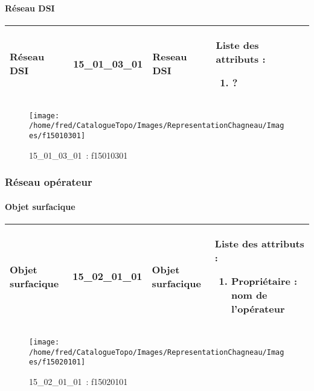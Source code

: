 \documentclass[12pt,titlepage]{book}
\begin{document}
\paragraph{Réseau DSI}
\noindent
\vspace{\baselineskip}

\renewcommand{\arraystretch}{1.2}
\begin{supertabular}{|p{10cm}|c|p{13cm}|p{12cm}|}
 Réseau DSI & 15\_01\_03\_01 & Reseau DSI & Liste des attributs :
\begin{enumerate}
  \item ?\end{enumerate}
\\
\hline
\end{supertabular}
\begin{figure}[h!]
  \hfill         %
  \begin{minipage}[t]{3cm}
    \begin{center}
      \texttt{[image: /home/fred/CatalogueTopo/Images/RepresentationChagneau/Images/f15010301]}
      \caption[~15\_01\_03\_01]{\small{15\_01\_03\_01~:} \tiny{f15010301}}\label{f15010301}
    \end{center}
  \end{minipage}
\end{figure}

\subsubsection{\large Réseau opérateur}
\paragraph{Objet surfacique}
\noindent
\vspace{\baselineskip}

\renewcommand{\arraystretch}{1.2}
\begin{supertabular}{|p{10cm}|c|p{13cm}|p{12cm}|}
 Objet surfacique & 15\_02\_01\_01 & Objet surfacique & Liste des attributs :
\begin{enumerate}
  \item Propriétaire : nom de l'opérateur\end{enumerate}
\\
\hline
\end{supertabular}
\begin{figure}[h!]
  \hfill         %
  \begin{minipage}[t]{3cm}
    \begin{center}
      \texttt{[image: /home/fred/CatalogueTopo/Images/RepresentationChagneau/Images/f15020101]}
      \caption[~15\_02\_01\_01]{\small{15\_02\_01\_01~:} \tiny{f15020101}}\label{f15020101}
    \end{center}
  \end{minipage}
\end{figure}
\end{document}
